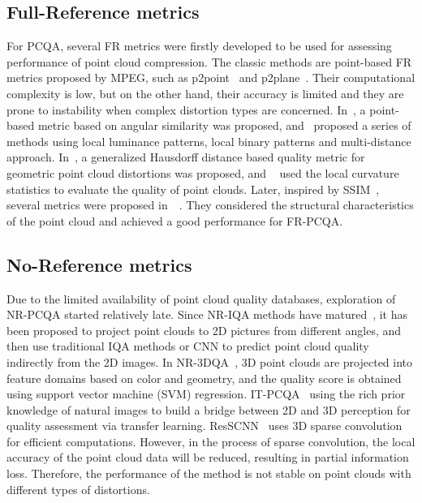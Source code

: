 \documentclass[conference]{IEEEtran}
\begin{document}
\subsection{Full-Reference metrics}
For PCQA, several FR metrics were firstly developed to be used for assessing performance of point cloud compression. The classic methods are point-based FR metrics proposed by MPEG, such as p2point~\cite{mekuria2016evaluation} and p2plane~\cite{tian2017geometric}. Their computational complexity is low, but on the other hand, their accuracy is limited and they are prone to instability when complex distortion types are concerned. In~\cite{alexiou2018point}, a point-based metric based on angular similarity was proposed, and~\cite{meynet2019pc} proposed a series of methods using local luminance patterns, local binary patterns and multi-distance approach. In~\cite{javaheri2020generalized}, a generalized Hausdorff distance based quality metric for geometric point cloud distortions was proposed, and
~\cite{meynet2019pc} used the local curvature statistics to evaluate the quality of point clouds. Later, inspired by SSIM~\cite{wang2004image}, several metrics were proposed in~\cite{yang2020inferring}~\cite{liu2022perceptual}. They considered the structural characteristics of the point cloud and achieved a good performance for FR-PCQA.



\subsection{No-Reference metrics}
Due to the limited availability of point cloud quality databases, exploration of NR-PCQA started relatively late. Since NR-IQA methods have matured~\cite{liu2021pqa}, it has been proposed to project point clouds to 2D pictures from different angles, and then use traditional IQA methods or CNN to predict point cloud quality indirectly from the 2D images. In NR-3DQA~\cite{zhang2022no}, 3D point clouds are projected into feature domains based on color and geometry, and the quality score is obtained using support vector machine (SVM) regression. IT-PCQA~\cite{yang2022no} using the rich prior knowledge of natural images to build a bridge between 2D and 3D perception for quality assessment via transfer learning. 
ResSCNN~\cite{liu2022point} uses 3D sparse convolution for efficient computations. However, in the process of sparse convolution, the local accuracy of the point cloud data will be reduced, resulting in partial information loss. Therefore, the performance of the method is not stable on point clouds with different types of distortions. 
\end{document}
